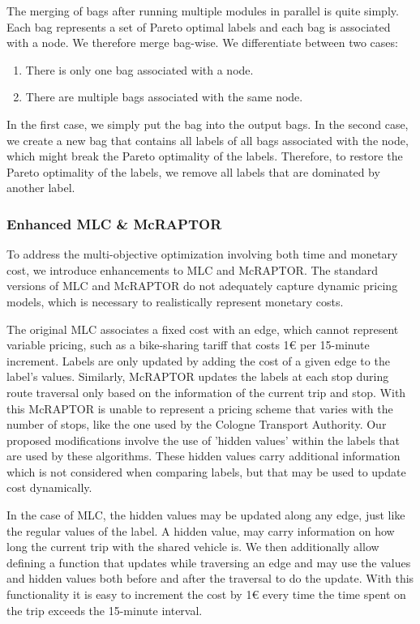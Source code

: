 The merging of bags after running multiple modules in parallel is quite simply.
Each bag represents a set of Pareto optimal labels and each bag is associated with a node.
We therefore merge bag-wise.
We differentiate between two cases:
\begin{enumerate}
    \item There is only one bag associated with a node.
    \item There are multiple bags associated with the same node.
\end{enumerate}
In the first case, we simply put the bag into the output bags.
In the second case, we create a new bag that contains all labels of all bags associated with the node, which might break the Pareto optimality of the labels.
Therefore, to restore the Pareto optimality of the labels, we remove all labels that are dominated by another label.

\subsubsection{Enhanced MLC \& McRAPTOR}
\label{subsubsec:enhanced_mlc_and_mcraptor}

To address the multi-objective optimization involving both time and monetary cost, we introduce enhancements to MLC and McRAPTOR. 
The standard versions of MLC and McRAPTOR do not adequately capture dynamic pricing models, which is necessary to realistically represent monetary costs.

The original MLC associates a fixed cost with an edge, which cannot represent variable pricing, such as a bike-sharing tariff that costs 1€ per 15-minute increment. 
Labels are only updated by adding the cost of a given edge to the label's values.
Similarly, McRAPTOR updates the labels at each stop during route traversal only based on the information of the current trip and stop. 
With this McRAPTOR is unable to represent a pricing scheme that varies with the number of stops, like the one used by the Cologne Transport Authority.
Our proposed modifications involve the use of 'hidden values' within the labels that are used by these algorithms. 
These hidden values carry additional information which is not considered when comparing labels, but that may be used to update cost dynamically.

In the case of MLC, the hidden values may be updated along any edge, just like the regular values of the label.
A hidden value, may carry information on how long the current trip with the shared vehicle is.
We then additionally allow defining a function that updates while traversing an edge and may use the values and hidden values both before and after the traversal to do the update.
With this functionality it is easy to increment the cost by 1€ every time the time spent on the trip exceeds the 15-minute interval.

